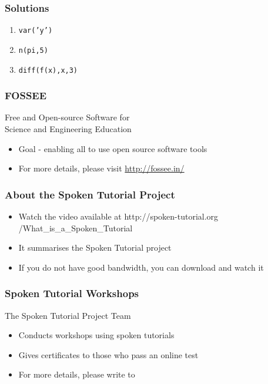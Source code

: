 \documentclass[17pt,compress]{beamer}
\begin{document}
\begin{frame}
\frametitle{Solutions}
\label{sec-16}


\begin{enumerate}
\item \texttt{var('y')}\pause
\vspace{8pt}
\item \texttt{n(pi,5)}\pause
\vspace{8pt}
\item \texttt{diff(f(x),x,3)}
\end{enumerate}
\end{frame}
\begin{frame}
\frametitle{FOSSEE}
{\color{blue}Free and Open-source Software for \\Science and Engineering Education} \\
\begin{itemize}
\item Goal - enabling all to use open source software tools
\item For more details, please visit {\color{blue}\url{http://fossee.in/}}
\end{itemize}
\end{frame}
\begin{frame}
\frametitle{About the Spoken Tutorial Project}
\begin{itemize}
\item Watch the video available at {\color{blue}http://spoken-tutorial.org /What\_is\_a\_Spoken\_Tutorial}
\item It summarises the Spoken Tutorial project \pause
\item If you do not have good bandwidth, you can download and watch it
\end{itemize}
\end{frame}
\begin{frame}
\frametitle{Spoken Tutorial Workshops}The Spoken Tutorial Project Team 
\begin{itemize}
\item Conducts workshops using spoken tutorials 
\item Gives certificates to those who pass an online test 
\item For more details, please write to \\ 
\end{itemize}
\end{frame}
\end{document}
